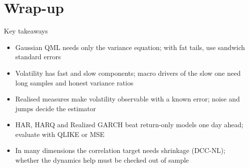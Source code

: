 \section{Wrap-up}

\begin{frame}{Key takeaways}
\itemsize{\small}
\begin{itemize}
    \item Gaussian QML needs only the variance equation; with fat tails, use sandwich standard errors
    \item Volatility has fast and slow components; macro drivers of the slow one need long samples and honest variance ratios
    \item Realised measures make volatility observable with a known error; noise and jumps decide the estimator
    \item HAR, HARQ and Realized GARCH beat return-only models one day ahead; evaluate with QLIKE or MSE
    \item In many dimensions the correlation target needs shrinkage (DCC-NL); whether the dynamics help must be checked out of sample
\end{itemize}
\end{frame}

